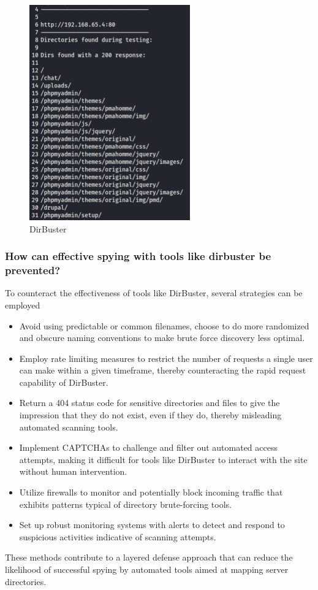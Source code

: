 \begin{figure}[H]
    \centering
    \includegraphics[width=0.4\linewidth]{pic/DirBuster.png}
    \caption{DirBuster}
    \label{fig:DirBuster}
\end{figure}


\subsubsection{How can effective spying with tools like dirbuster be prevented?}

To counteract the effectiveness of tools like DirBuster, several strategies can be employed

\begin{itemize}
    \item Avoid using predictable or common filenames, choose to do more randomized and obscure naming conventions to make brute force discovery less optimal.
    \item Employ rate limiting measures to restrict the number of requests a single user can make within a given timeframe, thereby counteracting the rapid request capability of DirBuster.
    \item Return a 404 status code for sensitive directories and files to give the impression that they do not exist, even if they do, thereby misleading automated scanning tools.
    \item Implement CAPTCHAs to challenge and filter out automated access attempts, making it difficult for tools like DirBuster to interact with the site without human intervention.
    \item Utilize firewalls to monitor and potentially block incoming traffic that exhibits patterns typical of directory brute-forcing tools.
    \item Set up robust monitoring systems with alerts to detect and respond to suspicious activities indicative of scanning attempts.
\end{itemize}
These methods contribute to a layered defense approach that can reduce the likelihood of successful spying by automated tools aimed at mapping server directories.


